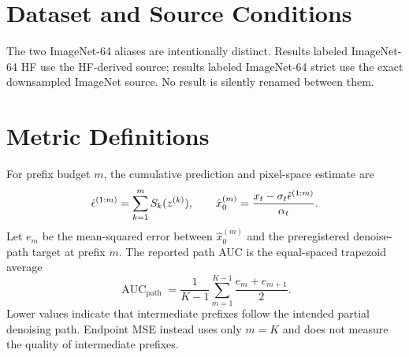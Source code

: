\section{Dataset and Source Conditions}

The two ImageNet-64 aliases are intentionally distinct. Results labeled
ImageNet-64 HF use the HF-derived source; results labeled ImageNet-64 strict use
the exact downsampled ImageNet source. No result is silently renamed between
them.

\begin{table}[t]
  \centering
  \scriptsize
  \caption{Dataset roles in the locked evidence matrix.}
  \label{tab:app-datasets}
\end{table}

\section{Metric Definitions}

For prefix budget $m$, the cumulative prediction and pixel-space estimate are
\begin{equation}
  \hat{\epsilon}^{(1:m)}=\sum_{k=1}^{m}S_k(z^{(k)}), \qquad
  \hat{x}_0^{(m)}=\frac{x_t-\sigma_t\hat{\epsilon}^{(1:m)}}{\alpha_t}.
\end{equation}
Let $e_m$ be the mean-squared error between $\hat{x}_0^{(m)}$ and the
preregistered denoise-path target at prefix $m$. The reported path AUC is the
equal-spaced trapezoid average
\begin{equation}
  \operatorname{AUC}_{\mathrm{path}}
  =\frac{1}{K-1}\sum_{m=1}^{K-1}\frac{e_m+e_{m+1}}{2}.
\end{equation}
Lower values indicate that intermediate prefixes follow the intended partial
denoising path. Endpoint MSE instead uses only $m=K$ and does not measure the
quality of intermediate prefixes.

